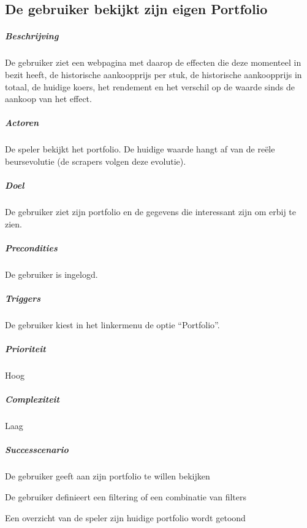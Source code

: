 \subsection{De gebruiker bekijkt zijn eigen Portfolio}
\begin{compact}
\subparagraph{Beschrijving} De gebruiker ziet een webpagina met daarop de effecten die deze momenteel in bezit heeft, de historische aankoopprijs per stuk, de historische aankoopprijs in totaal, de huidige koers, het rendement en het verschil op de waarde sinds de aankoop van het effect.
\subparagraph{Actoren} De speler bekijkt het portfolio. De huidige waarde hangt af van de re\"ele beursevolutie (de scrapers volgen deze evolutie).
\subparagraph{Doel} De gebruiker ziet zijn portfolio en de gegevens die interessant zijn om erbij te zien.
\subparagraph{Precondities} De gebruiker is ingelogd.
\subparagraph{Triggers} De gebruiker kiest in het linkermenu de optie ``Portfolio''.
\subparagraph{Prioriteit}Hoog
\subparagraph{Complexiteit}Laag
\subparagraph{Successcenario}
\begin{enumerate_compact}
 \item De gebruiker geeft aan zijn portfolio te willen bekijken
 \item De gebruiker definieert een filtering of een combinatie van filters
 \item Een overzicht van de speler zijn huidige portfolio wordt getoond
\end{enumerate_compact}
\end{compact}

